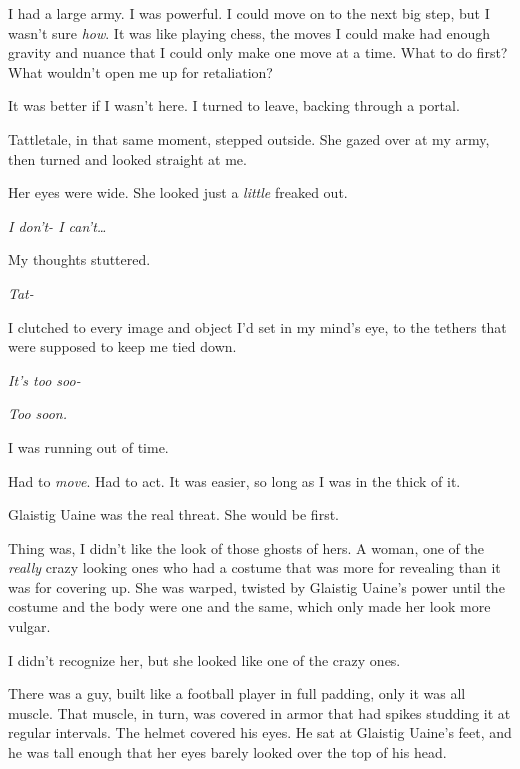 I had a large army.  I was powerful.  I could move on to the next big step, but I wasn't sure \emph{how}.  It was like playing chess, the moves I could make had enough gravity and nuance that I could only make one move at a time.  What to do first?  What wouldn't open me up for retaliation?



It was better if I wasn't here.  I turned to leave, backing through a portal.



Tattletale, in that same moment, stepped outside.  She gazed over at my army, then turned and looked straight at me.



Her eyes were wide.  She looked just a \emph{little} freaked out.



\emph{I don't-  I can't\ldots}



My thoughts stuttered.



\emph{Tat-}



I clutched to every image and object I'd set in my mind's eye, to the tethers that were supposed to keep me tied down.



\emph{I}\emph{t's too soo-}



\emph{Too soon.}



I was running out of time.



Had to \emph{move}.  Had to act.  It was easier, so long as I was in the thick of it.



Glaistig Uaine was the real threat.  She would be first.



Thing was, I didn't like the look of those ghosts of hers.  A woman, one of the \emph{really} crazy looking ones who had a costume that was more for revealing than it was for covering up.  She was warped, twisted by Glaistig Uaine's power until the costume and the body were one and the same, which only made her look more vulgar.



I didn't recognize her, but she looked like one of the crazy ones.



There was a guy, built like a football player in full padding, only it was all muscle.  That muscle, in turn, was covered in armor that had spikes studding it at regular intervals.  The helmet covered his eyes.  He sat at Glaistig Uaine's feet, and he was tall enough that her eyes barely looked over the top of his head.



